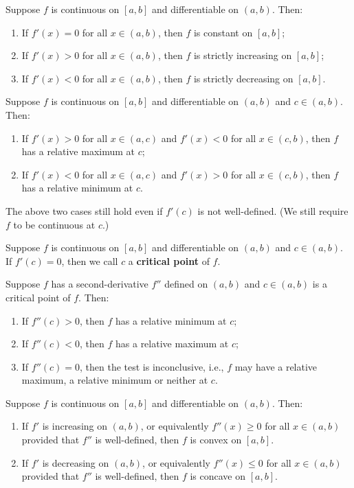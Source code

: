 \documentclass[a4paper]{ctexart}
\begin{document}
	\begin{mythm}
		Suppose $f$ is continuous on $[a,b]$ and differentiable on $(a,b)$. Then:
		\begin{enumerate}
			\item [(1)] If $f'(x)=0$ for all $x\in (a,b)$, then $f$ is constant on $[a,b]$;
			\item [(2)] If $f'(x)>0$ for all $x\in (a,b)$, then $f$ is strictly increasing on $[a,b]$;
			\item [(3)] If $f'(x)<0$ for all $x\in (a,b)$, then $f$ is strictly decreasing on $[a,b]$.
		\end{enumerate}
	\end{mythm}
	\begin{mythm}
		Suppose $f$ is continuous on $[a,b]$ and differentiable on $(a,b)$ and $c\in (a,b)$. Then:
		\begin{enumerate}
			\item [(1)] If $f'(x)>0$ for all $x\in (a,c)$ and $f'(x)<0$ for all $x\in (c,b)$, then $f$ has a relative maximum at $c$;
			\item [(2)] If $f'(x)<0$ for all $x\in (a,c)$ and $f'(x)>0$ for all $x\in (c,b)$, then $f$ has a relative minimum at $c$.
		\end{enumerate}
	\end{mythm}
	\begin{myrmk}
		The above two cases still hold even if $f'(c)$ is not well-defined. (We still require $f$ to be continuous at $c$.)
	\end{myrmk}
	\begin{mydef}
		Suppose $f$ is continuous on $[a,b]$ and differentiable on $(a,b)$ and $c\in (a,b)$. If $f'(c)=0$, then we call $c$ a \textbf{critical point} of $f$.
	\end{mydef}
	\begin{mythm}
		Suppose $f$ has a second-derivative $f''$ defined on $(a,b)$ and $c\in (a,b)$ is a critical point of $f$. Then:
		\begin{enumerate}
			\item [(1)] If $f''(c)>0$, then $f$ has a relative minimum at $c$;
			\item [(2)] If $f''(c)<0$, then $f$ has a relative maximum at $c$;
			\item [(3)] If $f''(c)=0$, then the test is inconclusive, i.e., $f$ may have a relative maximum, a relative minimum or neither at $c$.
		\end{enumerate}
	\end{mythm}
	\begin{mythm}
		Suppose $f$ is continuous on $[a,b]$ and differentiable on $(a,b)$. Then:
		\begin{enumerate}
			\item If $f'$ is increasing on $(a,b)$, or equivalently $f''(x) \geq 0$ for all $x \in (a,b)$ provided that $f''$ is well-defined, then $f$ is convex on $[a,b]$.
			\item If $f'$ is decreasing on $(a,b)$, or equivalently $f''(x) \leq 0$ for all $x \in (a,b)$ provided that $f''$ is well-defined, then $f$ is concave on $[a,b]$.
		\end{enumerate}
	\end{mythm}
\end{document}
